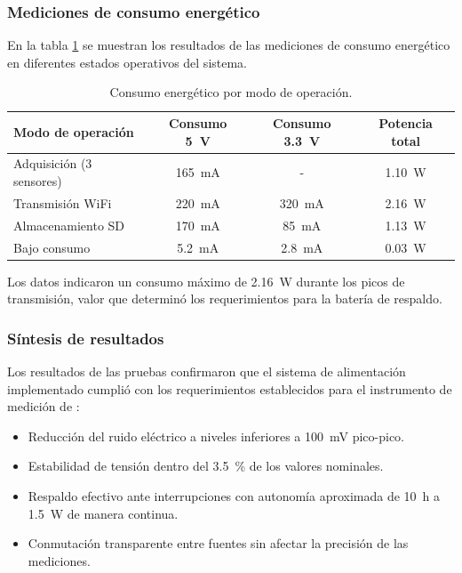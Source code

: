 \subsubsection{Mediciones de consumo energético}

En la tabla \ref{tab:consumo_energia} se muestran los resultados de las mediciones de consumo energético en diferentes estados operativos del sistema.

\begin{table}[!htp]
	\centering
	\caption{Consumo energético por modo de operación.}
	\begin{tabular}{lccc}
		\toprule
		\textbf{Modo de operación} & \textbf{Consumo \SI{5}{\volt}} & \textbf{Consumo \SI{3.3}{\volt}} & \textbf{Potencia total} \\
		\midrule
		Adquisición (3 sensores) & \SI{165}{\milli\ampere} & - & \SI{1.10}{\watt} \\
		Transmisión WiFi & \SI{220}{\milli\ampere} & \SI{320}{\milli\ampere} & \SI{2.16}{\watt} \\
		Almacenamiento SD & \SI{170}{\milli\ampere} & \SI{85}{\milli\ampere} & \SI{1.13}{\watt} \\
		Bajo consumo & \SI{5.2}{\milli\ampere} & \SI{2.8}{\milli\ampere} & \SI{0.03}{\watt} \\
		\bottomrule
	\end{tabular}
	\label{tab:consumo_energia}
\end{table}

Los datos indicaron un consumo máximo de \SI{2.16}{\watt} durante los picos de transmisión, valor que determinó los requerimientos para la batería de respaldo.

\subsubsection{Síntesis de resultados}

Los resultados de las pruebas confirmaron que el sistema de alimentación implementado cumplió con los requerimientos establecidos para el instrumento de medición de \MPF:

\begin{itemize}
	\item Reducción del ruido eléctrico a niveles inferiores a \SI{100}{\milli\volt} pico-pico.
	\item Estabilidad de tensión dentro del \SI{3.5}{\percent} de los valores nominales.
	\item Respaldo efectivo ante interrupciones con autonomía aproximada de \SI{10}{\hour} a \SI{1.5}{\watt} de manera continua.
	\item Conmutación transparente entre fuentes sin afectar la precisión de las mediciones.
\end{itemize}

